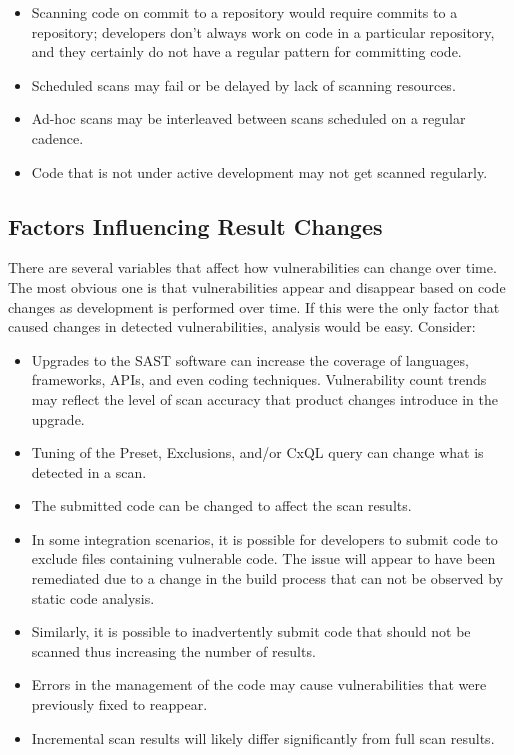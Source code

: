 \begin{itemize}
    \item Scanning code on commit to a repository would require commits to a repository; developers don't always work on code in a particular repository, 
    and they certainly do not have a regular pattern for committing code.
    \item Scheduled scans may fail or be delayed by lack of scanning resources.
    \item Ad-hoc scans may be interleaved between scans scheduled on a regular cadence.
    \item Code that is not under active development may not get scanned regularly.
\end{itemize}


\subsection{Factors Influencing Result Changes}

There are several variables that affect how vulnerabilities can change over time.  The most obvious one is that vulnerabilities appear and disappear based on code
changes as development is performed over time.  If this were the only factor that caused changes in detected vulnerabilities, analysis would be easy. Consider:

\begin{itemize}
    \item Upgrades to the SAST software can increase the coverage of languages, frameworks, APIs, and even coding techniques.  Vulnerability count trends may
    reflect the level of scan accuracy that product changes introduce in the upgrade.
    \item Tuning of the Preset, Exclusions, and/or CxQL query can change what is detected in a scan.
    \item The submitted code can be changed to affect the scan results.
    \item In some integration scenarios, it is possible for developers to submit code to exclude files containing vulnerable code. The issue will appear
    to have been remediated due to a change in the build process that can not be observed by static code analysis.
    \item Similarly, it is possible to inadvertently submit code that should not be scanned thus increasing the number of results.
    \item Errors in the management of the code may cause vulnerabilities that were previously fixed to reappear.
    \item Incremental scan results will likely differ significantly from full scan results.
\end{itemize}


